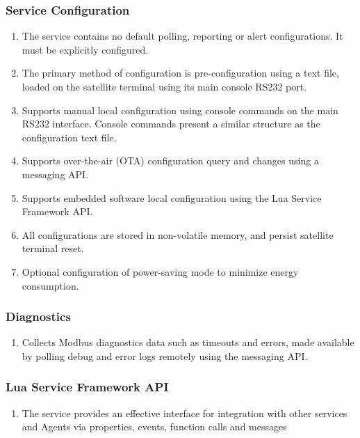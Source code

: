\documentclass[letterpaper,10pt,english]{sphinxmanual}
\begin{document}
\subsubsection{Service Configuration}
\label{\detokenize{funcspec:service-configuration}}\begin{enumerate}
\item {} 
The service contains no default polling, reporting or alert configurations.  It must be explicitly configured.

\item {} 
The primary method of configuration is pre-configuration using a text file, loaded on the satellite terminal using its main console RS232 port.

\item {} 
Supports manual local configuration using console commands on the main RS232 interface.  Console commands present a similar structure as the configuration text file.

\item {} 
Supports over-the-air (OTA) configuration query and changes using a messaging API.

\item {} 
Supports embedded software local configuration using the Lua Service Framework API.

\item {} 
All configurations are stored in non-volatile memory, and persist satellite terminal reset.

\item {} 
Optional configuration of power-saving mode to minimize energy consumption.

\end{enumerate}


\subsubsection{Diagnostics}
\label{\detokenize{funcspec:diagnostics}}\begin{enumerate}
\item {} 
Collects Modbus diagnostics data such as timeouts and errors, made available by polling debug and error logs remotely using the messaging API.

\end{enumerate}


\subsubsection{Lua Service Framework API}
\label{\detokenize{funcspec:lua-service-framework-api}}\begin{enumerate}
\item {} 
The service provides an effective interface for integration with other services and Agents via properties, events, function calls and messages

\end{enumerate}
\end{document}
